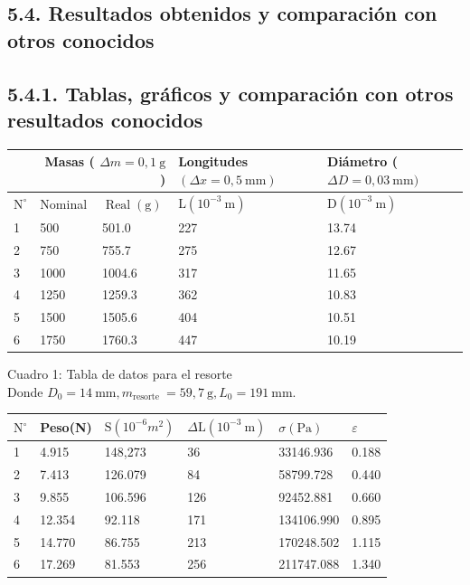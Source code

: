 \documentclass[10pt]{article}
\begin{document}
\subsection*{5.4. Resultados obtenidos y comparación con otros conocidos}
\subsection*{5.4.1. Tablas, gráficos y comparación con otros resultados conocidos}
\begin{center}
\begin{tabular}{|l|l|l|l|l|}
\hline
 & \multicolumn{2}{|r|}{Masas ( $\Delta m=0,1 \mathrm{~g}$ )} & Longitudes $(\Delta x=0,5 \mathrm{~mm})$ & Diámetro ( $\Delta D=0,03 \mathrm{~mm})$ \\
\hline
$\mathrm{N}^{\circ}$ & Nominal & $\operatorname{Real}(\mathrm{g})$ & $\mathrm{L}\left(10^{-3} \mathrm{~m}\right)$ & $\mathrm{D}\left(10^{-3} \mathrm{~m}\right)$ \\
\hline
1 & 500 & 501.0 & 227 & 13.74 \\
\hline
2 & 750 & 755.7 & 275 & 12.67 \\
\hline
3 & 1000 & 1004.6 & 317 & 11.65 \\
\hline
4 & 1250 & 1259.3 & 362 & 10.83 \\
\hline
5 & 1500 & 1505.6 & 404 & 10.51 \\
\hline
6 & 1750 & 1760.3 & 447 & 10.19 \\
\hline
\end{tabular}
\end{center}

Cuadro 1: Tabla de datos para el resorte\\
Donde $D_{0}=14 \mathrm{~mm}, m_{\text {resorte }}=59,7 \mathrm{~g}, L_{0}=191 \mathrm{~mm}$.

\begin{center}
\begin{tabular}{|l|l|l|l|l|l|}
\hline
$\mathrm{N}^{\circ}$ & Peso(N) & $\mathrm{S}\left(10^{-6} m^{2}\right)$ & $\Delta \mathrm{L}\left(10^{-3} \mathrm{~m}\right)$ & $\sigma(\mathrm{Pa})$ & $\varepsilon$ \\
\hline
1 & 4.915 & 148,273 & 36 & 33146.936 & 0.188 \\
\hline
2 & 7.413 & 126.079 & 84 & 58799.728 & 0.440 \\
\hline
3 & 9.855 & 106.596 & 126 & 92452.881 & 0.660 \\
\hline
4 & 12.354 & 92.118 & 171 & 134106.990 & 0.895 \\
\hline
5 & 14.770 & 86.755 & 213 & 170248.502 & 1.115 \\
\hline
6 & 17.269 & 81.553 & 256 & 211747.088 & 1.340 \\
\hline
\end{tabular}
\end{center}
\end{document}
